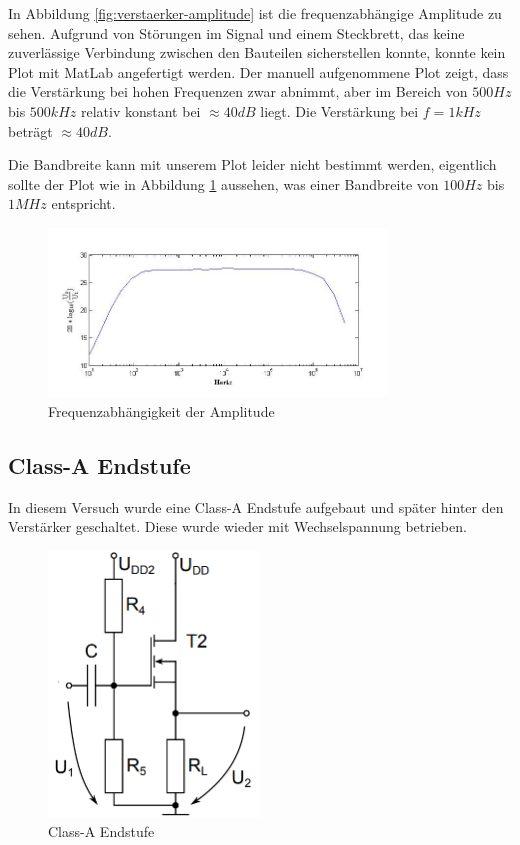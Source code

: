 \documentclass[a4paper]{article}
\begin{document}
In Abbildung \ref{fig:verstaerker-amplitude} ist die frequenzabhängige Amplitude zu sehen. Aufgrund von Störungen im Signal und einem Steckbrett, das keine zuverlässige Verbindung zwischen den Bauteilen sicherstellen konnte, konnte kein Plot mit MatLab angefertigt werden. Der manuell aufgenommene Plot zeigt, dass die Verstärkung bei hohen Frequenzen zwar abnimmt, aber im Bereich von $500\si{Hz}$ bis $500\si{kHz}$ relativ konstant bei $\approx 40\si{dB}$ liegt. Die Verstärkung bei $f=1\si{kHz}$ beträgt $\approx 40 \si{dB}$.

Die Bandbreite kann mit unserem Plot leider nicht bestimmt werden, eigentlich sollte der Plot wie in Abbildung \ref{fig:verstaerker-amplitude-ideal} aussehen, was einer Bandbreite von $100\si{Hz}$ bis $1\si{MHz}$ entspricht.

\begin{figure}[H]
    \centering
    \includegraphics[width=0.8\textwidth]{versuch3/4_3_Amplitudengang_01.jpg}
    \caption{Frequenzabhängigkeit der Amplitude}
    \label{fig:verstaerker-amplitude-ideal}
\end{figure}

\subsection{Class-A Endstufe}
In diesem Versuch wurde eine Class-A Endstufe aufgebaut und später hinter den Verstärker geschaltet. Diese wurde wieder mit Wechselspannung betrieben.
\begin{figure}[H]
    \centering
    \includegraphics[width=0.5\textwidth]{versuch3/versuch3_aufbau.png}
    \caption{Class-A Endstufe}
    \label{fig:versuch3-aufbau}
\end{figure}
\end{document}

